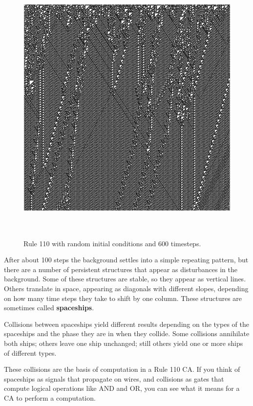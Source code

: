 \documentclass[10pt]{book}
\begin{document}
\begin{figure}
\label{rule110}
\centerline{\includegraphics[width=5.5in,height=5.5in]{figs/rule110random.eps}}
\caption{Rule 110 with random initial conditions and 600 timesteps.}
\end{figure}

After about 100 steps the background settles into a simple repeating
pattern, but there are a number of persistent structures that appear
as disturbances in the background.  Some of these structures
are stable, so they appear as vertical lines.  Others translate in
space, appearing as diagonals with different slopes, depending on
how many time steps they take to shift by one column.  These
structures are sometimes called {\bf spaceships}.

Collisions between spaceships yield different results
depending on the types of the spaceships and the phase they are in
when they collide.  Some collisions annihilate both ships; others
leave one ship unchanged; still others yield one or more ships of
different types.

These collisions are the basis of computation in a Rule 110 CA.  If
you think of spaceships as signals that propagate on wires, and
collisions as gates that compute logical operations like AND and OR,
you can see what it means for a CA to perform a computation.
\end{document}
